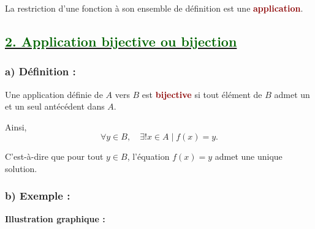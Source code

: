 \documentclass[12pt,a4paper]{article}
\begin{document}
La restriction d'une fonction à son ensemble de définition est une
\textcolor{darkred}{\textbf{application}}.


\subsection*{\underline{\textbf{\textcolor{darkgreen}{2. Application bijective ou bijection}}}}

\subsubsection*{\textbf{a) Définition :}}

Une application définie de $A$ vers $B$ est \textcolor{darkred}{\textbf{bijective}}
si tout élément de $B$ admet un et un seul antécédent dans $A$.

Ainsi,
\[
\forall y\in B,\quad \exists! x\in A\mid f(x)=y.
\]

C'est-à-dire que pour tout $y\in B$, l'équation $f(x)=y$
admet une unique solution.

\subsubsection*{\textbf{b) Exemple :}}

\textbf{Illustration graphique :}
\end{document}
